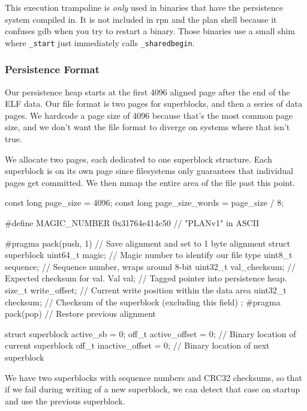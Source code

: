 This execution trampoline is \textit{only} used in binaries that have the
persistence system compiled in. It is not included in rpn and the plan shell
because it confuses gdb when you try to restart a binary. Those binaries use a
small shim where \lstinline|_start| just immediately
calls \lstinline|_sharedbegin|.

\subsubsection{Persistence Format}

Our persistence heap starts at the first 4096 aligned page after the end
of the ELF data. Our file format is two pages for superblocks, and then a
series of data pages. We hardcode a page size of 4096 because that's the most
common page size, and we don't want the file format to diverge on systems where
that isn't true.

We allocate two pages, each dedicated to one superblock structure. Each
superblock is on its own page since filesystems only guarantees that individual
pages get committed. We then mmap the entire area of the file past this point.

\begin{clang}
const long page_size = 4096;
const long page_size_words = page_size / 8;

#define MAGIC_NUMBER 0x31764e414c50 // "PLANv1" in ASCII

#pragma pack(push, 1)       // Save alignment and set to 1 byte alignment
struct superblock {
    uint64_t magic;         // Magic number to identify our file type
    uint8_t sequence;       // Sequence number, wraps around 8-bit
    uint32_t val_checksum;  // Expected checksum for val.
    Val val;                // Tagged pointer into persistence heap.
    size_t write_offset;    // Current write position within the data area
    uint32_t checksum;      // Checksum of the superblock (excluding this field)
};
#pragma pack(pop)           // Restore previous alignment

struct superblock active_sb = {0};
off_t active_offset = 0;    // Binary location of current superblock
off_t inactive_offset = 0;  // Binary location of next superblock
\end{clang}

We have two superblocks with sequence numbers and CRC32 checksums, so that if
we fail during writing of a new superblock, we can detect that case on startup
and use the previous superblock.

